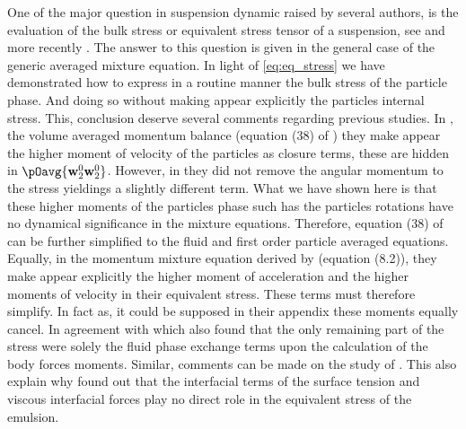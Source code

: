 One of the major question in suspension dynamic raised by several authors, is the evaluation of the bulk stress or equivalent stress tensor of a suspension, see \citep{prosperetti2006stress, batchelor1970stress,zhang1997momentum,nadim1996concise} and more recently \citet{dolata2020heterogeneous}. 
The answer to this question is given in the general case of the generic averaged mixture equation. 
In light of \ref{eq:eq_stress} we have demonstrated how to express in a routine manner the bulk stress of the particle phase. 
And doing so without making appear explicitly the particles  internal stress. 
This, conclusion deserve several comments regarding previous studies. 
In  \citet{jackson1997locally},  the volume averaged momentum balance (equation (38) of \citet{jackson1997locally}) they make appear the higher moment of velocity of the particles as closure terms, these are hidden in $\pOavg{\textbf{w}_2^0 \textbf{w}_2^0}$.
However, in \citet{jackson1997locally} they did not remove the angular momentum to the stress yieldings a slightly different term. 
What we have shown here is that these higher moments of the particles phase such has the particles rotations have no dynamical significance in the mixture equations. 
Therefore, equation (38) of \citet{jackson1997locally} can be further simplified to the fluid and first order particle averaged equations. 
Equally, in the momentum mixture equation derived by \citet{zhang1997momentum} (equation (8.2)), they make appear explicitly the higher moment of acceleration and the higher moments of velocity in their equivalent stress. 
These terms must therefore simplify. 
In fact as, it could be supposed in their appendix these moments equally cancel. 
In agreement with \citet{dolata2021faxen} which also found that the only remaining part of the stress were solely the fluid phase exchange terms upon the calculation of the body forces moments. 
Similar, comments can be made on the study of \citet{prosperetti2006stress}. 
This also explain why \citet{nadim1996concise} found out that the interfacial terms of the surface tension and viscous interfacial forces play no direct role in the equivalent stress of the emulsion.